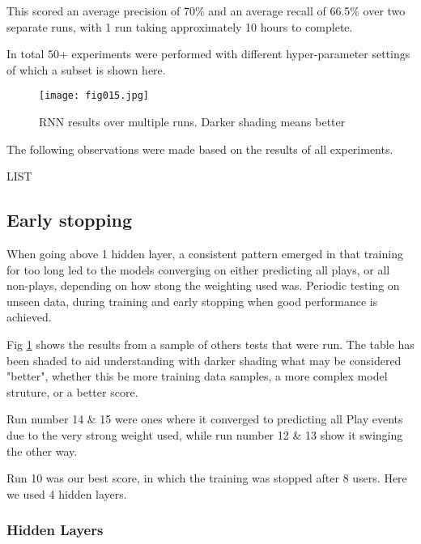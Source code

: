 This scored an average precision of 70\% and an average recall of 66.5\% over two separate runs, with 1 run taking approximately 10 hours to complete. 

In total 50+ experiments were performed with different hyper-parameter settings of which a subset is shown here.

\begin{figure}[h!]
	\centering
	\texttt{[image: fig015.jpg]}
	\caption{RNN results over multiple runs. Darker shading means better}
	\label{fig15}
\end{figure}

The following observations were made based on the results of all experiments.

LIST

\subsection{Early stopping}

When going above 1 hidden layer, a consistent pattern emerged in that training for too long led to the models converging on either predicting all plays, or all non-plays, depending on how stong the weighting used was.
Periodic testing on unseen data, during training and early stopping when good performance is achieved.

Fig \ref{fig15} shows the results from a sample of others tests that were run. The table has been shaded to aid understanding with darker shading what may be considered "better", whether this be more training data samples, a more complex model struture, or a better score.



Run number 14 \& 15 were ones where it converged to predicting all Play events due to the very strong weight used, while run number 12 \& 13 show it swinging the other way.

Run 10 was our best score, in which the training was stopped after 8 users. Here we used 4 hidden layers. 

\subsubsection{Hidden Layers}

 
